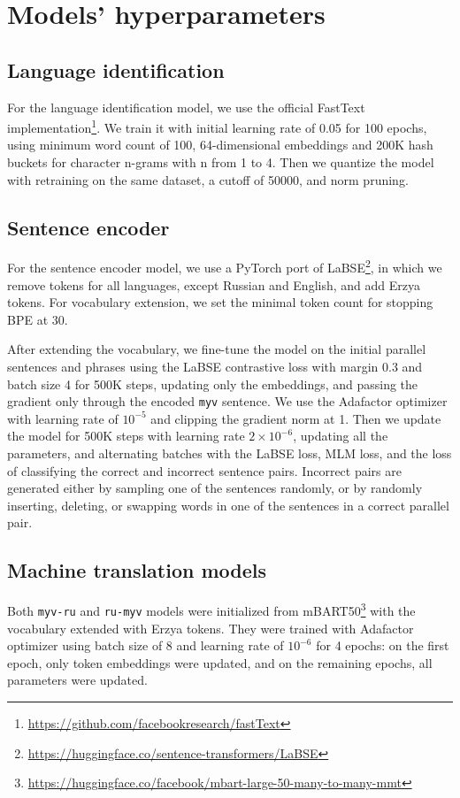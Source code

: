 \documentclass[11pt]{article}
\begin{document}
\section{Models' hyperparameters}
\label{app:hyperparameters}

\subsection{Language identification}
For the language identification model, we use the official FastText implementation\footnote{\url{https://github.com/facebookresearch/fastText}}. We train it with initial learning rate of 0.05 for 100 epochs, using minimum word count of 100, 64-dimensional embeddings and 200K hash buckets for character n-grams with n from 1 to 4. Then we quantize the model with retraining on the same dataset, a cutoff of 50000, and norm pruning.

\subsection{Sentence encoder}
For the sentence encoder model, we use a PyTorch port of LaBSE\footnote{\url{https://huggingface.co/sentence-transformers/LaBSE}}, in which we remove tokens for all languages, except Russian and English, and add Erzya tokens. For vocabulary extension, we set the minimal token count for stopping BPE at 30. 

After extending the vocabulary, we fine-tune the model on the initial parallel sentences and phrases using the LaBSE contrastive loss with margin 0.3 and batch size 4 for 500K steps, updating only the embeddings, and passing the gradient only through the encoded \texttt{myv} sentence. We use the Adafactor optimizer with learning rate of $10^{-5}$ and clipping the gradient norm at 1. Then we update the model for 500K steps with learning rate $2 \times 10^{-6}$, updating all the parameters, and alternating batches with the LaBSE loss, MLM loss, and the loss of classifying the correct and incorrect sentence pairs. Incorrect pairs are generated either by sampling one of the sentences randomly, or by randomly inserting, deleting, or swapping words in one of the sentences in a correct parallel pair.

\subsection{Machine translation models}
Both \texttt{myv-ru} and \texttt{ru-myv} models were initialized from mBART50\footnote{\url{https://huggingface.co/facebook/mbart-large-50-many-to-many-mmt}} with the vocabulary extended with Erzya tokens. They were trained with Adafactor optimizer using batch size of 8 and learning rate of $10^{-6}$ for 4 epochs: on the first epoch, only token embeddings were updated, and on the remaining epochs, all parameters were updated. 
\end{document}
